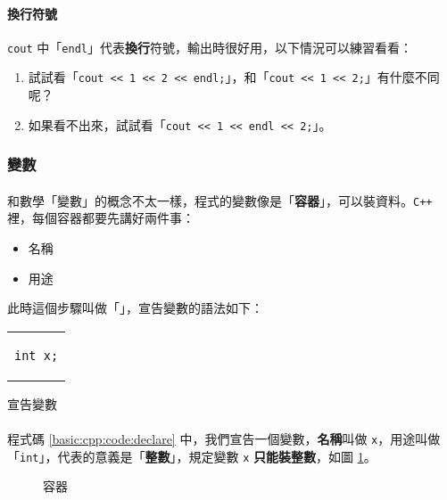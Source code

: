 \documentclass[12pt,a4paper,oneside]{article}
\begin{document}
\begin{CJK}{UTF8}{bkai}
\paragraph{換行符號}\lstinline!cout! 中「\lstinline!endl!」代表\textbf{換行}符號，輸出時很好用，以下情況可以練習看看：
\begin{enumerate}
\item 試試看「\lstinline!cout << 1 << 2 << endl;!」，和「\lstinline!cout << 1 << 2;!」有什麼不同呢？
\item 如果看不出來，試試看「\lstinline!cout << 1 << endl << 2;!」。
\end{enumerate}

\subsubsection{變數}

\paragraph{}和數學「變數」的概念不太一樣，程式的變數像是「\textbf{容器}」，可以裝資料。\texttt{C++} 裡，每個容器都要先講好兩件事：
\begin{itemize}
\item 名稱
\item 用途
\end{itemize}
此時這個步驟叫做「」，宣告變數的語法如下：

\begin{code}[h!]
\centering
\begin{tabular}{c}
\begin{lstlisting}
int x;
\end{lstlisting}
\end{tabular}
\caption{宣告變數}
\label{basic:cpp:code:declare}
\end{code}

\paragraph{}程式碼 \ref{basic:cpp:code:declare} 中，我們宣告一個變數，\textbf{名稱}叫做 \lstinline!x!，用途叫做「\lstinline!int!」，代表的意義是「\textbf{整數}」，規定變數 \lstinline!x! \textbf{只能裝整數}，如圖 \ref{basic:cpp:fig:variable}。

\begin{figure}[h]
\centering
{}
\caption{容器}
\label{basic:cpp:fig:variable}
\end{figure}


\end{CJK}
\end{document}
